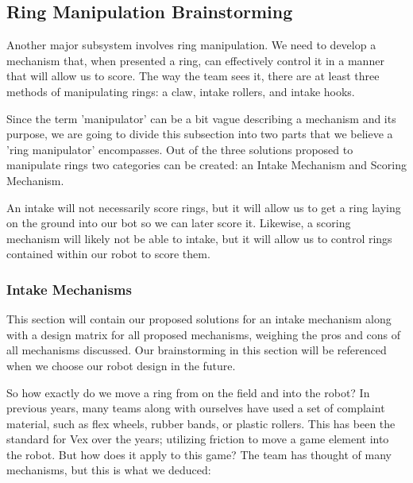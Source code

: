 \subsection{Ring Manipulation Brainstorming}
Another major subsystem involves ring manipulation. We need to develop a mechanism that, when presented a ring, can effectively control it in a manner that will allow us to score. The way the team sees it, there are at least three methods of manipulating rings: a claw, intake rollers, and intake hooks. 


Since the term 'manipulator' can be a bit vague describing a mechanism and its purpose, we are going to divide this subsection into two parts that we believe a 'ring manipulator' encompasses. Out of the three solutions proposed to manipulate rings two categories can be created: an Intake Mechanism and Scoring Mechanism. 


An intake will not necessarily score rings, but it will allow us to get a ring laying on the ground into our bot so we can later score it. Likewise, a scoring mechanism will likely not be able to intake, but it will allow us to control rings contained within our robot to score them. 
\subsubsection{Intake Mechanisms}
This section will contain our proposed solutions for an intake mechanism along with a design matrix for all proposed mechanisms, weighing the pros and cons of all mechanisms discussed. Our brainstorming in this section will be referenced when we choose our robot design in the future. 


So how exactly do we move a ring from on the field and into the robot? In previous years, many teams along with ourselves have used a set of complaint material, such as flex wheels, rubber bands, or plastic rollers. This has been the standard for Vex over the years; utilizing friction to move a game element into the robot. But how does it apply to this game? The team has thought of many mechanisms, but this is what we deduced:
